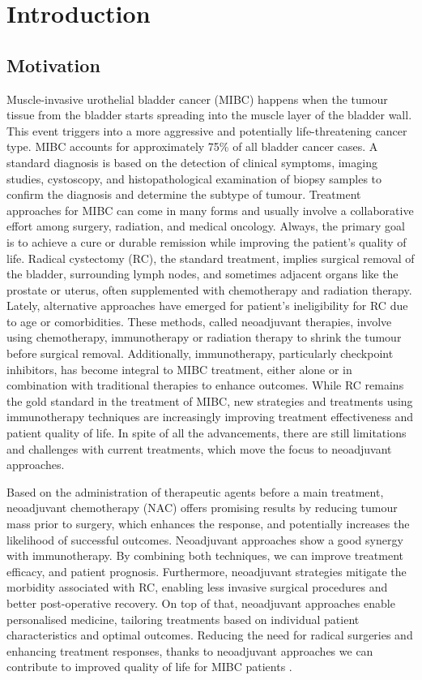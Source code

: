 \setchapterpreamble[u]{\margintoc}
\chapter{Introduction}

\section{Motivation}
Muscle-invasive urothelial bladder cancer (MIBC) happens when the tumour tissue from the bladder starts spreading into the muscle layer of the bladder wall. This event triggers into a more aggressive and potentially life-threatening cancer type. MIBC accounts for approximately 75\% of all bladder cancer cases\cite{Valderrama.BP}. A standard diagnosis is based on the detection of clinical symptoms, imaging studies, cystoscopy, and histopathological examination of biopsy samples to confirm the diagnosis and determine the subtype of tumour\cite{Aragon-Ching}. Treatment approaches for MIBC can come in many forms and usually involve a collaborative effort among surgery, radiation, and medical oncology. Always, the primary goal is to achieve a cure or durable remission while improving the patient’s quality of life. Radical cystectomy (RC), the standard treatment, implies surgical removal of the bladder, surrounding lymph nodes, and sometimes adjacent organs like the prostate or uterus, often supplemented with chemotherapy and radiation therapy\cite{Malkowicz}. Lately, alternative approaches have emerged for patient’s ineligibility for RC due to age or comorbidities. These methods, called neoadjuvant therapies, involve using chemotherapy, immunotherapy or radiation therapy to shrink the tumour before surgical removal. Additionally, immunotherapy, particularly checkpoint inhibitors, has become integral to MIBC treatment, either alone or in combination with traditional therapies to enhance outcomes\cite{Noauthors}. While RC remains the gold standard in the treatment of MIBC, new strategies and treatments using immunotherapy techniques are increasingly improving treatment effectiveness and patient quality of life. In spite of all the advancements, there are still limitations and challenges with current treatments, which move the focus to neoadjuvant approaches.

Based on the administration of therapeutic agents before a main treatment, neoadjuvant chemotherapy (NAC) offers promising results by reducing tumour mass prior to surgery, which enhances the response, and potentially increases the likelihood of successful outcomes. Neoadjuvant approaches show a good synergy with immunotherapy. By combining both techniques, we can improve treatment efficacy, and patient prognosis. Furthermore, neoadjuvant strategies mitigate the morbidity associated with RC, enabling less invasive surgical procedures and better post-operative recovery. On top of that, neoadjuvant approaches enable personalised medicine, tailoring treatments based on individual patient characteristics and optimal outcomes. Reducing the need for radical surgeries and enhancing treatment responses, thanks to neoadjuvant approaches we can contribute to improved quality of life for MIBC patients \cite{7}\cite{Nair}.

